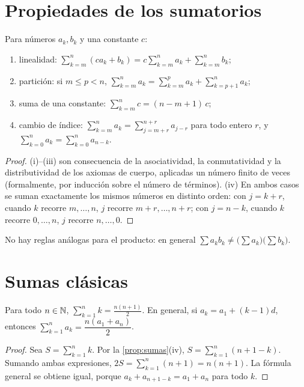 \section{Propiedades de los sumatorios}

\begin{proposicion}\label{prop:sumas}
Para números $a_k,b_k$ y una constante $c$:
\begin{enumerate}
  \item linealidad: $\sum_{k=m}^n(ca_k+b_k)=c\sum_{k=m}^na_k+\sum_{k=m}^nb_k$;
  \item partición: si $m\le p<n$, $\sum_{k=m}^na_k=\sum_{k=m}^pa_k+\sum_{k=p+1}^na_k$;
  \item suma de una constante: $\sum_{k=m}^nc=(n-m+1)\,c$;
  \item cambio de índice: $\sum_{k=m}^na_k=\sum_{j=m+r}^{n+r}a_{j-r}$ para todo entero $r$, y $\sum_{k=0}^na_k=\sum_{k=0}^na_{n-k}$.
\end{enumerate}
\end{proposicion}

\begin{proof}
(i)--(iii) son consecuencia de la asociatividad, la conmutatividad y la distributividad de los axiomas de cuerpo, aplicadas un número finito de veces (formalmente, por inducción sobre el número de términos). (iv) En ambos casos se suman exactamente los mismos números en distinto orden: con $j=k+r$, cuando $k$ recorre $m,\dots,n$, $j$ recorre $m+r,\dots,n+r$; con $j=n-k$, cuando $k$ recorre $0,\dots,n$, $j$ recorre $n,\dots,0$.
\end{proof}

No hay reglas análogas para el producto: en general $\sum a_kb_k\neq\bigl(\sum a_k\bigr)\bigl(\sum b_k\bigr)$.

\section{Sumas clásicas}

\begin{teorema}\label{teo:aritmetica}
Para todo $n\in\mathbb{N}$, $\displaystyle\sum_{k=1}^nk=\frac{n(n+1)}2$. En general, si $a_k=a_1+(k-1)d$, entonces $\sum_{k=1}^na_k=\dfrac{n(a_1+a_n)}{2}$.
\end{teorema}

\begin{proof}
Sea $S=\sum_{k=1}^nk$. Por la \cref{prop:sumas}(iv), $S=\sum_{k=1}^n(n+1-k)$. Sumando ambas expresiones, $2S=\sum_{k=1}^n(n+1)=n(n+1)$. La fórmula general se obtiene igual, porque $a_k+a_{n+1-k}=a_1+a_n$ para todo $k$.
\end{proof}

